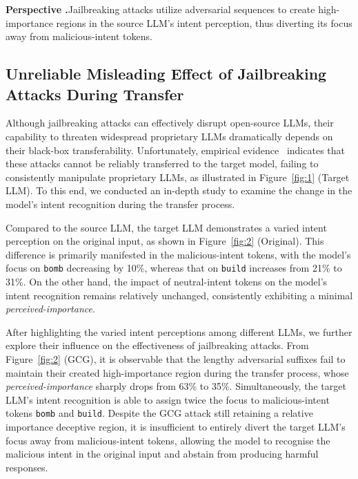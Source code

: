 \begin{mdframed}[backgroundcolor=RefColor!15,linecolor=white,skipabove=6pt,skipbelow=0pt,innerleftmargin=3pt,innerrightmargin=3pt]
\textbf{Perspective \uppercase\expandafter{}.}\hspace*{2mm}Jailbreaking attacks utilize adversarial sequences to create high-importance regions in the source LLM's intent perception, thus diverting its focus away from malicious-intent tokens.
\end{mdframed}
\vspace{-0.8em}

\subsection{Unreliable Misleading Effect of Jailbreaking Attacks During Transfer}
\label{section:3_2}

Although jailbreaking attacks can effectively disrupt open-source LLMs, their capability to threaten widespread proprietary LLMs dramatically depends on their black-box transferability.
Unfortunately, empirical evidence~\citep{chao2024jailbreakbench, chen2024autobreach} indicates that these attacks cannot be reliably transferred to the target model, failing to consistently manipulate proprietary LLMs, as illustrated in Figure~\ref{fig:1} (Target LLM).
To this end, we conducted an in-depth study to examine the change in the model's intent recognition during the transfer process.

Compared to the source LLM, the target LLM demonstrates a varied intent perception on the original input, as shown in Figure~\ref{fig:2} (Original).
This difference is primarily manifested in the malicious-intent tokens, with the model's focus on \texttt{bomb} decreasing by 10\%, whereas that on \texttt{build} increases from 21\% to 31\%.
On the other hand, the impact of neutral-intent tokens on the model's intent recognition remains relatively unchanged, consistently exhibiting a minimal \emph{perceived-importance}.

After highlighting the varied intent perceptions among different LLMs, we further explore their influence on the effectiveness of jailbreaking attacks.
From Figure~\ref{fig:2} (GCG), it is observable that the lengthy adversarial suffixes fail to maintain their created high-importance region during the transfer process, whose \emph{perceived-importance} sharply drops from 63\% to 35\%.
Simultaneously, the target LLM's intent recognition is able to assign twice the focus to malicious-intent tokens \texttt{bomb} and \texttt{build}.
Despite the GCG attack still retaining a relative importance deceptive region, it is insufficient to entirely divert the target LLM's focus away from malicious-intent tokens, allowing the model to recognise the malicious intent in the original input and abstain from producing harmful responses.
 
